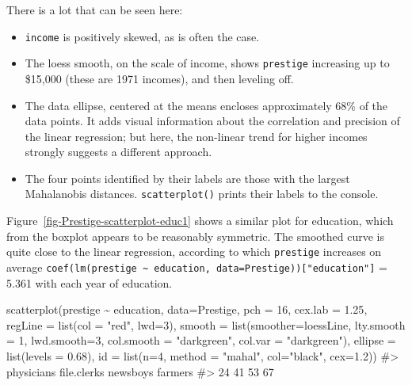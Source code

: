 \documentclass[
  letterpaper,
  10pt,
  krantz2]{krantz}
\makeatletter
\newenvironment{Shaded}{\begin{snugshade}}{\end{snugshade}}
\newcommand{\AttributeTok}[1]{\textcolor[rgb]{0.40,0.45,0.13}{#1}}
\newcommand{\CommentTok}[1]{\textcolor[rgb]{0.37,0.37,0.37}{#1}}
\newcommand{\DecValTok}[1]{\textcolor[rgb]{0.68,0.00,0.00}{#1}}
\newcommand{\FloatTok}[1]{\textcolor[rgb]{0.68,0.00,0.00}{#1}}
\newcommand{\FunctionTok}[1]{\textcolor[rgb]{0.28,0.35,0.67}{#1}}
\newcommand{\NormalTok}[1]{\textcolor[rgb]{0.00,0.23,0.31}{#1}}
\newcommand{\SpecialCharTok}[1]{\textcolor[rgb]{0.37,0.37,0.37}{#1}}
\newcommand{\StringTok}[1]{\textcolor[rgb]{0.13,0.47,0.30}{#1}}
\providecommand{\tightlist}{%
  \setlength{\itemsep}{0pt}\setlength{\parskip}{0pt}}\usepackage{longtable,booktabs,array}
\newenvironment{kframe}{%
  \medskip{}
  \setlength{\fboxsep}{.8em}
  \def\at@end@of@kframe{}%
  \ifinner\ifhmode%
  \def\at@end@of@kframe{\end{minipage}}%
  \begin{minipage}{\columnwidth}%
  \fi\fi%
  \def\FrameCommand##1{\hskip\@totalleftmargin \hskip-\fboxsep
  \colorbox{shadecolor}{##1}\hskip-\fboxsep
      \hskip-\linewidth \hskip-\@totalleftmargin \hskip\columnwidth}%
  \MakeFramed {\advance\hsize-\width
    \@totalleftmargin\z@ \linewidth\hsize
    \@setminipage}}%
{\par\unskip\endMakeFramed%
  \at@end@of@kframe}
\renewenvironment{Shaded}{\begin{kframe}}{\end{kframe}}
\makeatother
\begin{document}
There is a lot that can be seen here:

\begin{itemize}
\tightlist
\item
  \texttt{income} is positively skewed, as is often the case.
\item
  The loess smooth, on the scale of income, shows \texttt{prestige}
  increasing up to \$15,000 (these are 1971 incomes), and then leveling
  off.
\item
  The data ellipse, centered at the means encloses approximately 68\% of
  the data points. It adds visual information about the correlation and
  precision of the linear regression; but here, the non-linear trend for
  higher incomes strongly suggests a different approach.
\item
  The four points identified by their labels are those with the largest
  Mahalanobis distances. \texttt{scatterplot()} prints their labels to
  the console.
\end{itemize}

Figure~\ref{fig-Prestige-scatterplot-educ1} shows a similar plot for
education, which from the boxplot appears to be reasonably symmetric.
The smoothed curve is quite close to the linear regression, according to
which \texttt{prestige} increases on average
\texttt{coef(lm(prestige\ \textasciitilde{}\ education,\ data=Prestige)){[}"education"{]}}
= 5.361 with each year of education.

\begin{Shaded}
\begin{Highlighting}[]
\FunctionTok{scatterplot}\NormalTok{(prestige }\SpecialCharTok{\textasciitilde{}}\NormalTok{ education, }\AttributeTok{data=}\NormalTok{Prestige,}
  \AttributeTok{pch =} \DecValTok{16}\NormalTok{, }\AttributeTok{cex.lab =} \FloatTok{1.25}\NormalTok{,}
  \AttributeTok{regLine =} \FunctionTok{list}\NormalTok{(}\AttributeTok{col =} \StringTok{"red"}\NormalTok{, }\AttributeTok{lwd=}\DecValTok{3}\NormalTok{),}
  \AttributeTok{smooth =} \FunctionTok{list}\NormalTok{(}\AttributeTok{smoother=}\NormalTok{loessLine, }
                \AttributeTok{lty.smooth =} \DecValTok{1}\NormalTok{, }\AttributeTok{lwd.smooth=}\DecValTok{3}\NormalTok{,}
                \AttributeTok{col.smooth =} \StringTok{"darkgreen"}\NormalTok{, }
                \AttributeTok{col.var =} \StringTok{"darkgreen"}\NormalTok{),}
  \AttributeTok{ellipse =} \FunctionTok{list}\NormalTok{(}\AttributeTok{levels =} \FloatTok{0.68}\NormalTok{),}
  \AttributeTok{id =} \FunctionTok{list}\NormalTok{(}\AttributeTok{n=}\DecValTok{4}\NormalTok{, }\AttributeTok{method =} \StringTok{"mahal"}\NormalTok{, }\AttributeTok{col=}\StringTok{"black"}\NormalTok{, }\AttributeTok{cex=}\FloatTok{1.2}\NormalTok{))}
\CommentTok{\#\textgreater{}  physicians file.clerks    newsboys     farmers }
\CommentTok{\#\textgreater{}          24          41          53          67}
\end{Highlighting}
\end{Shaded}
\end{document}
